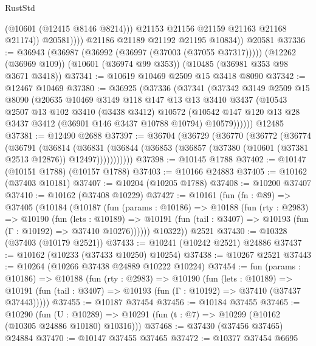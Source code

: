 \begin{lexlean}{RustStd}
\begin{coremodule}
                      (@10601 (@12415 @8146 @8214)))
                    @21153
                    @21156
                    @21159
                    @21163
                    @21168
                    @21174))
                @20581))))
        @21186
        @21189
        @21192
        @21195
        @10834))
    @20581
@37336 := @36943
    (@36987 (@36992 (@36997 (@37003 (@37055 @37317)))))
    (@12262 (@36969 @109))
    (@10601 (@36974 @99 @353))
    (@10485 (@36981 @353 @98 @3671 @3418))
@37341 := @10619 @10469 @2509 @15 @3418 @8090
@37342 := @12467 @10469
@37380 := @36925
    (@37336
      (@37341
        (@37342
          @3149
          @2509
          @15
          @8090
          (@20635
            @10469
            @3149
            @118
            @147
            @13
            @13
            @3410
            @3437
            (@10543
              @2507
              @13
              @102
              @3410
              (@3438 @3412)
              @10572
              (@10542 @147 @120 @13 @28 @3437 @3412 (@36901 @146 @3437 @10788 @10794) @10579))))))
    @12485
@37381 := @12490 @2688
@37397 := @36704
    (@36729
      (@36770
        (@36772
          (@36774
            (@36791
              (@36814
                (@36831
                  (@36844 (@36853 (@36857 (@37380 (@10601 (@37381 @2513 @12876)) @12497)))))))))))
@37398 := @10145 @1788
@37402 := @10147 (@10151 @1788) (@10157 @1788)
@37403 := @10166 @24883
@37405 := @10162 (@37403 @10181)
@37407 := @10204 (@10205 @1788)
@37408 := @10200 @37407
@37410 := @10162 (@37408 @10229)
@37427 := @10161
    (fun (fn : @89) =>
    @37405
      (@10184
        (@10187
          (fun (params : @10186) =>
          @10188
            (fun (rty : @2983) =>
            @10190
              (fun (lets : @10189) =>
              @10191 (fun (tail : @3407) => @10193 (fun (Γ : @10192) => @37410 @10276))))))
        @10322))
    @2521
@37430 := @10328 (@37403 (@10179 @2521))
@37433 := @10241 (@10242 @2521) @24886
@37437 := @10162 (@10233 (@37433 @10250) @10254)
@37438 := @10267 @2521
@37443 := @10264 (@10266 @37438 @24889 @10222 @10224)
@37454 := fun (params : @10186) =>
  @10188
    (fun (rty : @2983) =>
    @10190
      (fun (lets : @10189) =>
      @10191 (fun (tail : @3407) => @10193 (fun (Γ : @10192) => @37410 (@37437 @37443)))))
@37455 := @10187 @37454
@37456 := @10184 @37455
@37465 := @10290
    (fun (U : @10289) => @10291 (fun (t : @7) => @10299 (@10162 (@10305 @24886 @10180) @10316)))
@37468 := @37430 (@37456 @37465) @24884
@37470 := @10147 @37455 @37465
@37472 := @10377 @37454 @6695

\end{coremodule}
\end{lexlean}
